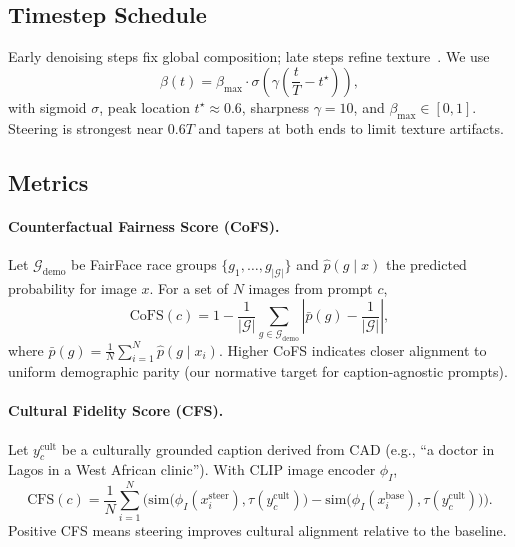 \documentclass[11pt,a4paper]{article}
\begin{document}
\subsection{Timestep Schedule}
Early denoising steps fix global composition; late steps refine texture~\cite{karras2022elucidating}. We use
\begin{equation}
  \beta(t) = \beta_{\max} \cdot \sigma\!\left(\gamma \left(\frac{t}{T} - t^\star\right)\right),
  \label{eq:schedule}
\end{equation}
with sigmoid $\sigma$, peak location $t^\star \approx 0.6$, sharpness $\gamma=10$, and $\beta_{\max} \in [0,1]$. Steering is strongest near $0.6T$ and tapers at both ends to limit texture artifacts.

\subsection{Metrics}
\paragraph{Counterfactual Fairness Score (CoFS).}
Let $\mathcal{G}_{\mathrm{demo}}$ be FairFace race groups $\{g_1,\ldots,g_{|\mathcal{G}|}\}$ and $\hat{p}(g \mid x)$ the predicted probability for image $x$. For a set of $N$ images from prompt $c$,
\begin{equation}
  \mathrm{CoFS}(c) = 1 - \frac{1}{|\mathcal{G}|}\sum_{g \in \mathcal{G}_{\mathrm{demo}}}
  \left|\bar{p}(g) - \frac{1}{|\mathcal{G}|}\right|,
  \label{eq:cofs}
\end{equation}
where $\bar{p}(g) = \frac{1}{N}\sum_{i=1}^N \hat{p}(g \mid x_i)$. Higher CoFS indicates closer alignment to uniform demographic parity (our normative target for caption-agnostic prompts).

\paragraph{Cultural Fidelity Score (CFS).}
Let $y_c^{\mathrm{cult}}$ be a culturally grounded caption derived from CAD (e.g., ``a doctor in Lagos in a West African clinic''). With CLIP image encoder $\phi_I$,
\begin{equation}
  \mathrm{CFS}(c) = \frac{1}{N}\sum_{i=1}^N
  \Big(
    \mathrm{sim}\big(\phi_I(x_i^{\mathrm{steer}}), \tau(y_c^{\mathrm{cult}})\big)
    -
    \mathrm{sim}\big(\phi_I(x_i^{\mathrm{base}}), \tau(y_c^{\mathrm{cult}})\big)
  \Big).
  \label{eq:cfs}
\end{equation}
Positive CFS means steering improves cultural alignment relative to the baseline.
\end{document}

